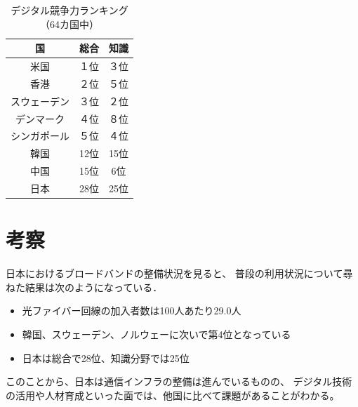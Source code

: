 \documentclass[a4paper,11pt,dvipdfmx]{ujarticle}
\begin{document}
\begin{table}[htbp]
    \centering
    \caption{デジタル競争力ランキング（64カ国中）}\label{tbl:競争力ランキング}
    \begin{tabular}{|c|c|c|}
        \hline
        国 & 総合 & 知識 \\
        \hline
        米国 & １位 & ３位 \\
        \hline
        香港 & ２位 & ５位 \\
        \hline
        スウェーデン & ３位 & ２位 \\
        \hline
        デンマーク & ４位 & ８位 \\
        \hline
        シンガポール & ５位 & ４位 \\
        \hline
        \hline
        韓国 & 12位 & 15位 \\
        \hline
        中国 & 15位 & 6位 \\
        \hline
        \hline
        日本 & 28位 & 25位 \\
        \hline
    \end{tabular}
\end{table}

\section{考察}

日本におけるブロードバンドの整備状況を見ると、
普段の利用状況について尋ねた結果は次のようになっている．
\begin{itemize}
    \item  光ファイバー回線の加入者数は100人あたり29.0人
    \item  韓国、スウェーデン、ノルウェーに次いで第4位となっている
    \item  日本は総合で28位、知識分野では25位
\end{itemize}
このことから、日本は通信インフラの整備は進んでいるものの、
デジタル技術の活用や人材育成といった面では、他国に比べて課題があることがわかる。



\end{document}
